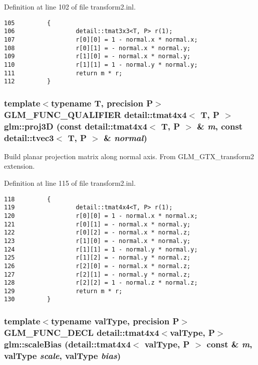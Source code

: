 Definition at line 102 of file transform2.inl.

\begin{Code}\begin{verbatim}105         {
106                 detail::tmat3x3<T, P> r(1);
107                 r[0][0] = 1 - normal.x * normal.x;
108                 r[0][1] = - normal.x * normal.y;
109                 r[1][0] = - normal.x * normal.y;
110                 r[1][1] = 1 - normal.y * normal.y;
111                 return m * r;
112         }
\end{verbatim}
\end{Code}


\hypertarget{group__gtx__transform2_gea404ce6c1541825232f418242bff9fb}{
\subsubsection[proj3D]{\setlength{\rightskip}{0pt plus 5cm}template$<$typename T, precision P$>$ GLM\_\-FUNC\_\-QUALIFIER detail::tmat4x4$<$ T, P $>$ glm::proj3D (const detail::tmat4x4$<$ T, P $>$ \& {\em m}, \/  const detail::tvec3$<$ T, P $>$ \& {\em normal})}}
\label{group__gtx__transform2_gea404ce6c1541825232f418242bff9fb}


Build planar projection matrix along normal axis. From GLM\_\-GTX\_\-transform2 extension. 

Definition at line 115 of file transform2.inl.

\begin{Code}\begin{verbatim}118         {
119                 detail::tmat4x4<T, P> r(1);
120                 r[0][0] = 1 - normal.x * normal.x;
121                 r[0][1] = - normal.x * normal.y;
122                 r[0][2] = - normal.x * normal.z;
123                 r[1][0] = - normal.x * normal.y;
124                 r[1][1] = 1 - normal.y * normal.y;
125                 r[1][2] = - normal.y * normal.z;
126                 r[2][0] = - normal.x * normal.z;
127                 r[2][1] = - normal.y * normal.z;
128                 r[2][2] = 1 - normal.z * normal.z;
129                 return m * r;
130         }
\end{verbatim}
\end{Code}


\hypertarget{group__gtx__transform2_g235e65153daa1bdc12fcc07c8019931b}{
\subsubsection[scaleBias]{\setlength{\rightskip}{0pt plus 5cm}template$<$typename valType, precision P$>$ GLM\_\-FUNC\_\-DECL detail::tmat4x4$<$valType, P$>$ glm::scaleBias (detail::tmat4x4$<$ valType, P $>$ const \& {\em m}, \/  valType {\em scale}, \/  valType {\em bias})}}
\label{group__gtx__transform2_g235e65153daa1bdc12fcc07c8019931b}


